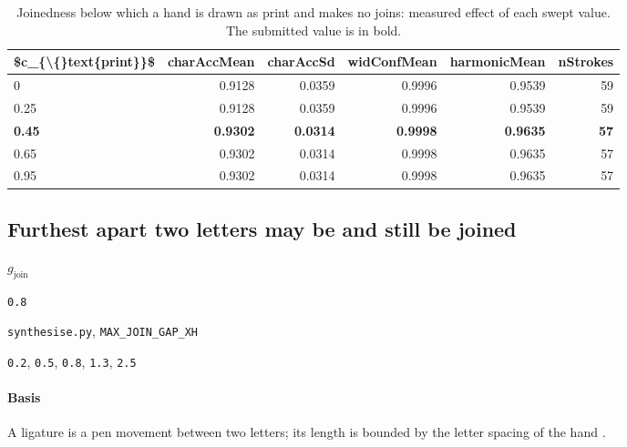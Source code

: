 \begin{table}[htbp]
\centering
\small
\caption{Joinedness below which a hand is drawn as print and makes no joins: measured effect of each swept value. The submitted value is in bold.}
\begin{tabular}{lrrrrr}
\toprule
\$c\_\{\textbackslash\{\}text\{print\}\}\$ & \textsf{charAccMean} & \textsf{charAccSd} & \textsf{widConfMean} & \textsf{harmonicMean} & \textsf{nStrokes} \\
\midrule
0 & 0.9128 & 0.0359 & 0.9996 & 0.9539 & 59 \\
0.25 & 0.9128 & 0.0359 & 0.9996 & 0.9539 & 59 \\
\bfseries 0.45 & \bfseries 0.9302 & \bfseries 0.0314 & \bfseries 0.9998 & \bfseries 0.9635 & \bfseries 57 \\
0.65 & 0.9302 & 0.0314 & 0.9998 & 0.9635 & 57 \\
0.95 & 0.9302 & 0.0314 & 0.9998 & 0.9635 & 57 \\
\bottomrule
\end{tabular}
\end{table}

\subsection{Furthest apart two letters may be and still be joined}

\label{coef:max-join-gap}

\begin{description}[leftmargin=5.2em,style=sameline]

\item[Symbol] $g_{\text{join}}$

\item[Value] \texttt{0.8}

\item[Source] \texttt{synthesise.py}, \texttt{MAX\_JOIN\_GAP\_XH}

\item[Swept] \texttt{0.2}, \texttt{0.5}, \texttt{0.8}, \texttt{1.3}, \texttt{2.5}

\end{description}

\paragraph{Basis}

A ligature is a pen movement between two letters; its length is bounded by the letter spacing of the hand \cite{plamondon2000}.

